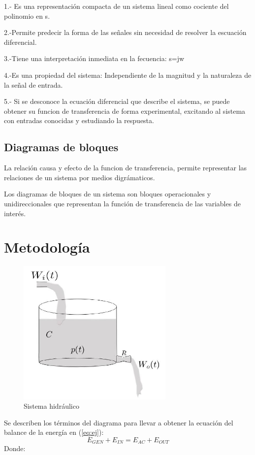 \documentclass[12pt,letterpaper]{article}     %
\begin{document}
1.- Es una representación compacta de un sistema lineal como cociente del polinomio en s.

2.-Permite predecir la forma de las señales sin necesidad de resolver la escuación diferencial.

3.-Tiene una interpretación inmediata en la fecuencia: s=jw 

4.-Es una propiedad del sistema: Independiente de la magnitud y la naturaleza de la señal de entrada.

5.- Si se desconoce la ecuación diferencial que describe el sistema, se puede obtener su funcion de transferencia de forma experimental, excitando al sistema con entradas conocidas y estudiando la respuesta.

\subsection*{Diagramas de bloques}
La relación causa y efecto  de la funcion de transferencia, permite representar las relaciones de un sistema por medios digrámaticos.

Los diagramas de bloques de un sistema son bloques operacionales y unidireccionales que representan la función de transferencia de las variables de interés.




\section{Metodología}

\begin{figure}[h!]
\centering
\includegraphics[width=3in]{6}
\caption{Sistema hidráulico}

\end{figure}
Se describen los términos del diagrama para llevar a obtener la ecuación del balance de la energía en (\ref{eq:ej}):
\begin{equation}\label{eq:ej}
E_{GEN} + E_{IN} = E_{AC} + E_{OUT}
\end{equation}
Donde:
\end{document}
